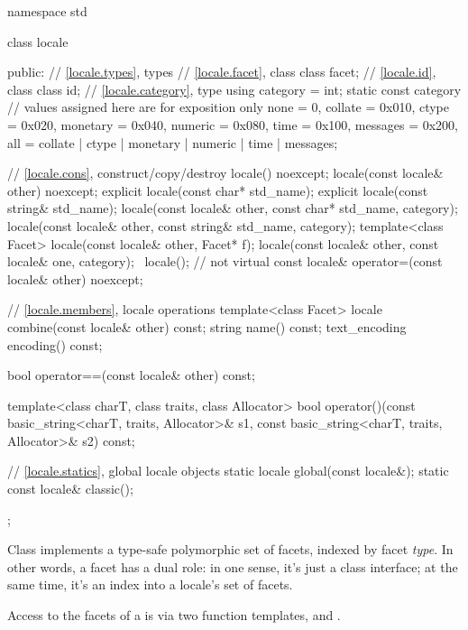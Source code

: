 \begin{codeblock}
namespace std {
  class locale {
  public:
    // \ref{locale.types}, types
    // \ref{locale.facet}, class 
    class facet;
    // \ref{locale.id}, class 
    class id;
    // \ref{locale.category}, type 
    using category = int;
    static const category   // values assigned here are for exposition only
      none     = 0,
      collate  = 0x010, ctype    = 0x020,
      monetary = 0x040, numeric  = 0x080,
      time     = 0x100, messages = 0x200,
      all = collate | ctype | monetary | numeric | time  | messages;

    // \ref{locale.cons}, construct/copy/destroy
    locale() noexcept;
    locale(const locale& other) noexcept;
    explicit locale(const char* std_name);
    explicit locale(const string& std_name);
    locale(const locale& other, const char* std_name, category);
    locale(const locale& other, const string& std_name, category);
    template<class Facet> locale(const locale& other, Facet* f);
    locale(const locale& other, const locale& one, category);
    ~locale();                  // not virtual
    const locale& operator=(const locale& other) noexcept;

    // \ref{locale.members}, locale operations
    template<class Facet> locale combine(const locale& other) const;
    string name() const;
    text_encoding encoding() const;

    bool operator==(const locale& other) const;

    template<class charT, class traits, class Allocator>
      bool operator()(const basic_string<charT, traits, Allocator>& s1,
                      const basic_string<charT, traits, Allocator>& s2) const;

    // \ref{locale.statics}, global locale objects
    static       locale  global(const locale&);
    static const locale& classic();
  };
}
\end{codeblock}

\pnum
Class  implements a type-safe polymorphic set of facets,
indexed by facet \textit{type}.
In other words, a facet has a dual role:
in one sense, it's just a class interface;
at the same time, it's an index into a locale's set of facets.

\pnum
Access to the facets of a  is via two function templates,
 and .

